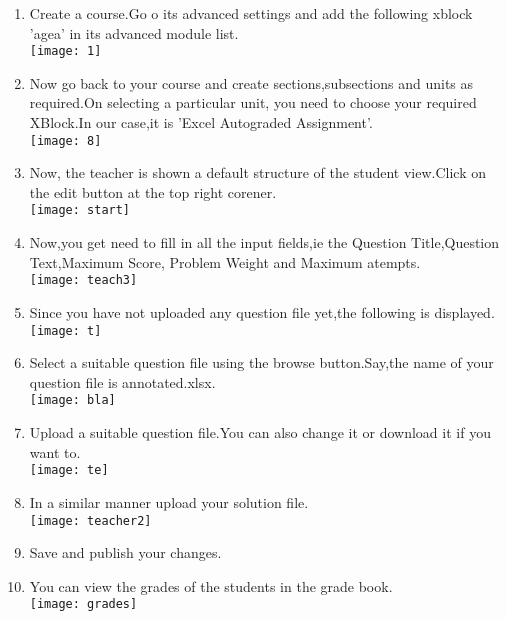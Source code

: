 \documentclass{scrreprt}
\begin{document}
\begin{enumerate}
\item Create a course.Go o its advanced settings and add the following xblock 'agea' in its advanced module list.\\
\texttt{[image: 1]}

\item Now go back to your course and create sections,subsections and units as required.On selecting a particular unit,
you need to choose your required XBlock.In our case,it is 'Excel Autograded Assignment'.\\
\texttt{[image: 8]}

\newpage 

\item Now, the teacher is shown a default structure of the student view.Click on the edit button at the top right corener.\\
\texttt{[image: start]}

\item Now,you get need to fill in all the input fields,ie the Question Title,Question Text,Maximum Score,
Problem Weight and Maximum atempts.\\
\texttt{[image: teach3]}

\newpage 

\item Since you have not uploaded any question file yet,the following is displayed.\\
\texttt{[image: t]}

\item Select a suitable question file using the browse button.Say,the name of your question file is annotated.xlsx.\\
\texttt{[image: bla]}

\item Upload a suitable question file.You can also change it or download it if you want to.\\
\texttt{[image: te]}

\newpage

\item In a similar manner upload your solution file.\\
\texttt{[image: teacher2]}

\item Save and publish your changes.

\item You can view the grades of the students in the grade book.\\
\texttt{[image: grades]}
\end{enumerate}
\end{document}

